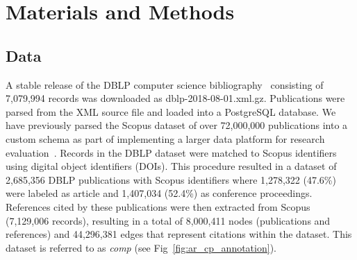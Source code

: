 \section{Materials and Methods}
\label{sec:methods}

\subsection{Data}
 A stable release of the DBLP computer science bibliography~\cite{dblp_ref} consisting of 7,079,994 records was downloaded as dblp-2018-08-01.xml.gz. Publications were parsed from the XML source file and loaded into a PostgreSQL database. We have previously parsed the Scopus dataset of over 72,000,000 publications into a custom schema as part of implementing a larger data platform for research evaluation~\cite{GithubERNIE2019}. Records in the DBLP dataset were matched to Scopus identifiers using digital object identifiers (DOIs). This procedure resulted in a dataset of 2,685,356 DBLP publications with Scopus identifiers where 1,278,322 (47.6\%) were labeled as article and 1,407,034 (52.4\%) as conference proceedings. References cited by these publications were then extracted from Scopus (7,129,006 records), resulting in a total of 8,000,411 nodes (publications and references) and 44,296,381 edges that represent citations within the dataset. This dataset is referred to as \emph{comp} (see Fig~\ref{fig:ar_cp_annotation}).
 
